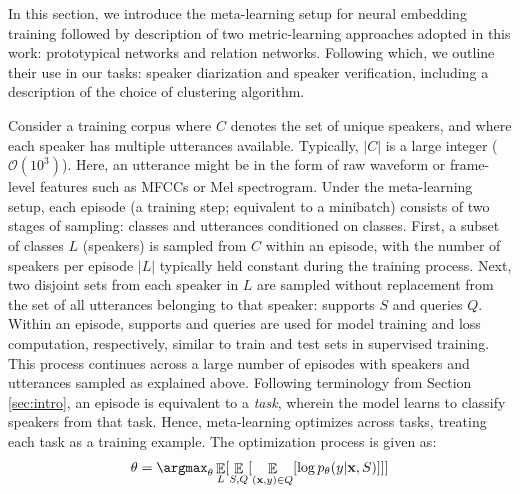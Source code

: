 In this section, we introduce the meta-learning setup for neural embedding training followed by description of two metric-learning approaches adopted in this work: prototypical networks and relation networks. Following which, we outline their use in our tasks: speaker diarization and speaker verification, including a description of the choice of clustering algorithm.

Consider a training corpus where $C$ denotes the set of unique speakers, and where each speaker has multiple utterances available. Typically, $|C|$ is a large integer
($\mathcal{O}(10^3)$).  
Here, an utterance might be in the form of raw waveform or frame-level features such as MFCCs or Mel spectrogram. 
Under the meta-learning setup, each episode (a training step; equivalent to a minibatch) consists of two stages of sampling: classes and utterances conditioned on classes. 
First, a subset of classes $L$ (speakers) is sampled from $C$ within an episode, with the number of speakers per episode $|L|$ typically held constant during the training process. 
Next, two disjoint sets from each speaker in $L$ are sampled without replacement from the set of all utterances belonging to that speaker: supports $S$ and queries $Q$. 
Within an episode, supports and queries are used for model training and loss computation, respectively, similar to train and test sets in supervised training. This process continues across a large number of episodes with speakers and utterances sampled as explained above.
Following terminology from Section \ref{sec:intro}, an episode is equivalent to a \textit{task}, wherein the model learns to classify speakers from that task. Hence, meta-learning optimizes across tasks, treating each task as a training example. The optimization process is given as:
\begin{equation}
    \theta = \argmax_{\theta} \displaystyle \mathop{\mathbb{E}}_{L} [ \mathop{\mathbb{E}}_{S, Q} [ \mathop{\mathbb{E}}_{(\mathbf{x},y) \in Q} [ \log p_\theta (y|\mathbf{x},S)] ]]
\end{equation}
